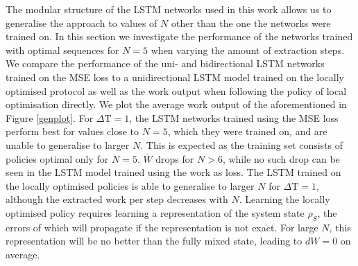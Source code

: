 The modular structure of the LSTM networks used in this work allows us to generalise the approach to values of $N$ other than the one the networks were trained on.
In this section we investigate the performance of the networks trained with optimal sequences for $N=5$ when varying the amount of extraction steps.
We compare the performance of the uni- and bidirectional LSTM networks trained on the MSE loss to a unidirectional LSTM model trained on the locally optimised protocol as well as the work output when following the policy of local optimisation directly.
We plot the average work output of the aforementioned in Figure \ref{genplot}.
For $\Delta \mathrm{T} = 1$, the LSTM networks trained using the MSE loss perform best for values close to $N=5$, which they were trained on, and are unable to generalise to larger $N$.
This is expected as the training set consists of policies optimal only for $N=5$.
$\overline{W}$ drops for $N > 6$, while no such drop can be seen in the LSTM model trained using the work as loss.
The LSTM trained on the locally optimised policies is able to generalise to larger $N$ for $\Delta \mathrm{T} = 1$, although the extracted work per step decreases with $N$.
Learning the locally optimised policy requires learning a representation of the system state $\rho_S$, the errors of which will propagate if the representation is not exact.
For large $N$, this representation will be no better than the fully mixed state, leading to $dW = 0$ on average.


